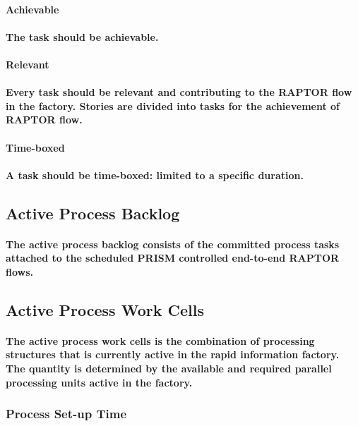 \documentclass{acm_proc_article-sp}
\begin{document}
\paragraph{\textbf{Achievable}}
\paragraph{The task should be achievable.}
\paragraph{\textbf{Relevant}}
\paragraph{Every task should be relevant and contributing to the RAPTOR flow in the factory. Stories are divided into tasks for the achievement of RAPTOR flow.}
\paragraph{\textbf{Time-boxed}}
\paragraph{A task should be time-boxed: limited to a specific duration.}
\subsection{\textbf{Active Process Backlog}}
\paragraph{The active process backlog consists of the committed process tasks attached to the scheduled PRISM controlled end-to-end RAPTOR flows.}
\subsection{\textbf{Active Process Work Cells}}
\paragraph{The active process work cells is the combination of processing structures that is currently active in the rapid information factory. The quantity is determined by the available and required parallel processing units active in the factory.}
\subsubsection{\textbf{Process Set-up Time}}
\end{document}
